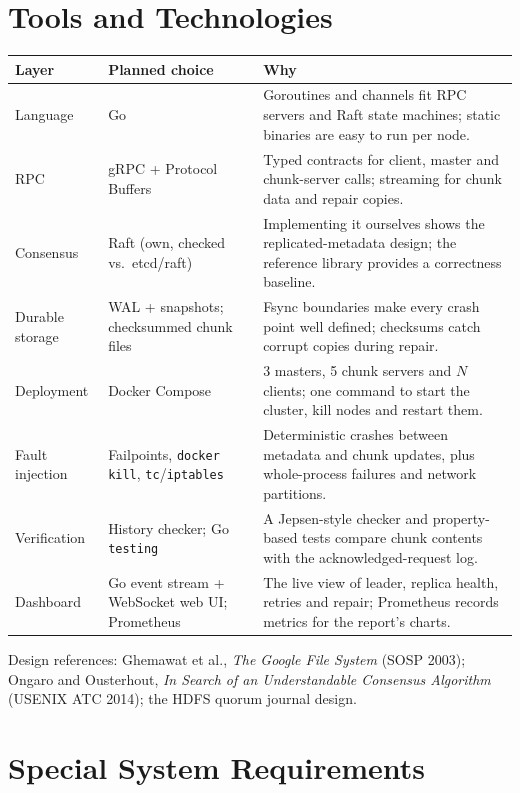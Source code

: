 \documentclass[10pt,a4paper]{article}
\begin{document}
\section{Tools and Technologies}

{\small
\begin{tabularx}{\textwidth}{@{}l l X@{}}
\toprule
\textbf{Layer} & \textbf{Planned choice} & \textbf{Why} \\
\midrule
Language & Go & Goroutines and channels fit RPC servers and Raft state machines; static binaries are easy to run per node. \\
RPC & gRPC + Protocol Buffers & Typed contracts for client, master and chunk-server calls; streaming for chunk data and repair copies. \\
Consensus & Raft (own, checked vs.\ etcd/raft) & Implementing it ourselves shows the replicated-metadata design; the reference library provides a correctness baseline. \\
Durable storage & WAL + snapshots; checksummed chunk files & Fsync boundaries make every crash point well defined; checksums catch corrupt copies during repair. \\
Deployment & Docker Compose & 3 masters, 5 chunk servers and $N$ clients; one command to start the cluster, kill nodes and restart them. \\
Fault injection & Failpoints, \texttt{docker kill}, \texttt{tc}/\texttt{iptables} & Deterministic crashes between metadata and chunk updates, plus whole-process failures and network partitions. \\
Verification & History checker; Go \texttt{testing} & A Jepsen-style checker and property-based tests compare chunk contents with the acknowledged-request log. \\
Dashboard & Go event stream + WebSocket web UI; Prometheus & The live view of leader, replica health, retries and repair; Prometheus records metrics for the report's charts. \\
\bottomrule
\end{tabularx}
}

\smallskip
{\small Design references: Ghemawat et al., \emph{The Google File System} (SOSP 2003); Ongaro and
Ousterhout, \emph{In Search of an Understandable Consensus Algorithm} (USENIX ATC 2014); the HDFS quorum
journal design.}

\section{Special System Requirements}
\end{document}
